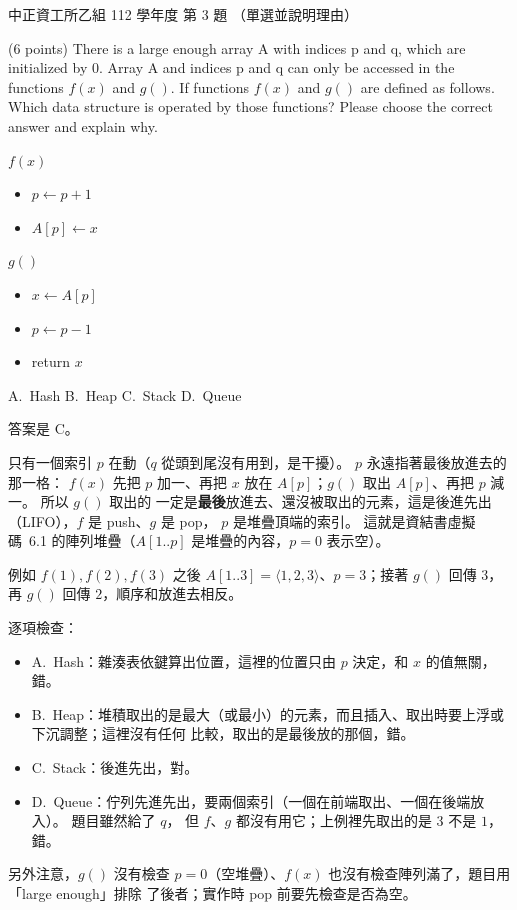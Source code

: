\begin{pastexam}[label={px:ccu-112-csb-02}]{中正資工所乙組 112 學年度 第 3 題}
（單選並說明理由）

(6 points) There is a large enough array A with indices p and q, which are initialized by 0. Array
A and indices p and q can only be accessed in the functions $f(x)$ and $g()$. If functions $f(x)$
and $g()$ are defined as follows. Which data structure is operated by those functions? Please
choose the correct answer and explain why.

$f(x)$
\begin{itemize}
\item $p \leftarrow p+1$
\item $A[p] \leftarrow x$
\end{itemize}

$g()$
\begin{itemize}
\item $x \leftarrow A[p]$
\item $p \leftarrow p-1$
\item return $x$
\end{itemize}
A.~Hash \qquad B.~Heap \qquad C.~Stack \qquad D.~Queue
\end{pastexam}

\begin{pastsoln}
答案是 C。

只有一個索引 $p$ 在動（$q$ 從頭到尾沒有用到，是干擾）。 $p$ 永遠指著最後放進去的那一格：
$f(x)$ 先把 $p$ 加一、再把 $x$ 放在 $A[p]$；$g()$ 取出 $A[p]$、再把 $p$ 減一。 所以 $g()$ 取出的
一定是\textbf{最後}放進去、還沒被取出的元素，這是後進先出（LIFO），$f$ 是 push、$g$ 是 pop，
$p$ 是堆疊頂端的索引。 這就是資結書虛擬碼~6.1 的陣列堆疊（$A[1..p]$ 是堆疊的內容，$p = 0$ 表示空）。

例如 $f(1), f(2), f(3)$ 之後 $A[1..3] = \langle 1, 2, 3\rangle$、$p = 3$；接著 $g()$ 回傳 $3$，
再 $g()$ 回傳 $2$，順序和放進去相反。

逐項檢查：
\begin{itemize}
\item A.~Hash：雜湊表依鍵算出位置，這裡的位置只由 $p$ 決定，和 $x$ 的值無關，錯。
\item B.~Heap：堆積取出的是最大（或最小）的元素，而且插入、取出時要上浮或下沉調整；這裡沒有任何
比較，取出的是最後放的那個，錯。
\item C.~Stack：後進先出，對。
\item D.~Queue：佇列先進先出，要兩個索引（一個在前端取出、一個在後端放入）。 題目雖然給了 $q$，
但 $f$、$g$ 都沒有用它；上例裡先取出的是 $3$ 不是 $1$，錯。
\end{itemize}
另外注意，$g()$ 沒有檢查 $p = 0$（空堆疊）、$f(x)$ 也沒有檢查陣列滿了，題目用「large enough」排除
了後者；實作時 pop 前要先檢查是否為空。
\end{pastsoln}
